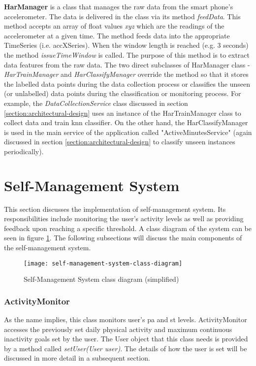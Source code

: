     \textbf{HarManager} is a class that manages the raw data from the smart phone's accelerometer. The data is delivered in the class via its method \textit{feedData}. This method accepts an array of float values \textit{xyz} which are the readings of the accelerometer at a given time. The method feeds data into the appropriate TimeSeries (i.e. accXSeries). When the window length is reached (e.g. 3 seconds) the method \textit{issueTimeWindow} is called. The purpose of this method is to extract data features from the raw data. The two direct subclasses of HarManager class - \textit{HarTrainManager} and \textit{HarClassifyManager} override the method so that it stores the labelled data points during the data collection process or classifies the unseen (or unlabelled) data points during the classification or monitoring process. For example, the \textit{DataCollectionService} class discussed in section \ref{section:architectural-design} uses an instance of the HarTrainManager class to collect data and train \gls{knn} classifier. On the other hand, the HarClassifyManager is used in the main service of the application called "ActiveMinutesService" (again discussed in section \ref{section:architectural-design} to classify unseen instances periodically). 
        
        
\section{Self-Management System}
\label{section:self-management-system}
This section discusses the implementation of self-management system. Its responsibilities include monitoring the user's activity levels as well as providing feedback upon reaching a specific threshold. A class diagram of the system can be seen in figure \ref{fig:self_management_system}. The following subsections will discuss the main components of the self-management system. 

\begin{figure}[ht]
    \centering
    \texttt{[image: self-management-system-class-diagram]}
    \caption{Self-Management System class diagram (simplified)}
    \label{fig:self_management_system}
\end{figure}

    \subsubsection{ActivityMonitor}
    \label{section:activity-monitor}
    As the name implies, this class monitors user's \gls{pa} and \gls{st} levels. ActivityMonitor accesses the previously set daily physical activity and maximum continuous inactivity goals set by the user. The User object that this class needs is provided by a method called \textit{setUser(User user)}. The details of how the user is set will be discussed in more detail in a subsequent section.
    
